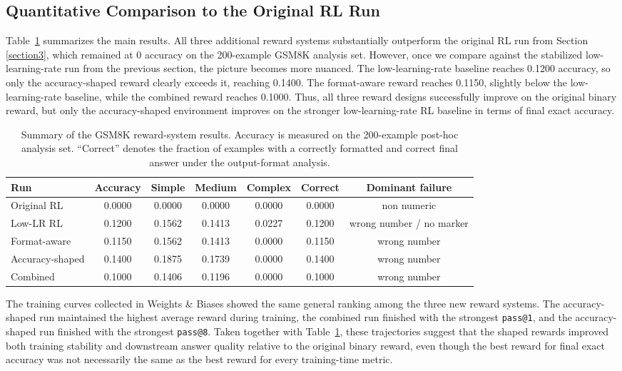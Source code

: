 \documentclass[a4paper,12pt]{article}
\begin{document}
\subsection{Quantitative Comparison to the Original RL Run}

Table~\ref{tab:reward-results-summary} summarizes the main results. All three additional reward systems substantially outperform the original RL run from Section \ref{section3}, which remained at 0 accuracy on the 200-example GSM8K analysis set. However, once we compare against the stabilized low-learning-rate run from the previous section, the picture becomes more nuanced. The low-learning-rate baseline reaches 0.1200 accuracy, so only the accuracy-shaped reward clearly exceeds it, reaching 0.1400. The format-aware reward reaches 0.1150, slightly below the low-learning-rate baseline, while the combined reward reaches 0.1000. Thus, all three reward designs successfully improve on the original binary reward, but only the accuracy-shaped environment improves on the stronger low-learning-rate RL baseline in terms of final exact accuracy.

\begin{table}[ht]
\centering
\footnotesize
\setlength{\tabcolsep}{3.5pt}
\begin{tabular}{lcccccc}
\hline
\textbf{Run} & \textbf{Accuracy} & \textbf{Simple} & \textbf{Medium} & \textbf{Complex} & \textbf{Correct} & \textbf{Dominant failure} \\
\hline
Original RL & 0.0000 & 0.0000 & 0.0000 & 0.0000 & 0.0000 & non numeric \\
Low-LR RL & 0.1200 & 0.1562 & 0.1413 & 0.0227 & 0.1200 & wrong number / no marker \\
Format-aware & 0.1150 & 0.1562 & 0.1413 & 0.0000 & 0.1150 & wrong number \\
Accuracy-shaped & 0.1400 & 0.1875 & 0.1739 & 0.0000 & 0.1400 & wrong number \\
Combined & 0.1000 & 0.1406 & 0.1196 & 0.0000 & 0.1000 & wrong number \\
\hline
\end{tabular}
\caption{Summary of the GSM8K reward-system results. Accuracy is measured on the 200-example post-hoc analysis set. ``Correct'' denotes the fraction of examples with a correctly formatted and correct final answer under the output-format analysis.}
\label{tab:reward-results-summary}
\end{table}

The training curves collected in Weights \& Biases showed the same general ranking among the three new reward systems. The accuracy-shaped run maintained the highest average reward during training, the combined run finished with the strongest \texttt{pass@1}, and the accuracy-shaped run finished with the strongest \texttt{pass@8}. Taken together with Table~\ref{tab:reward-results-summary}, these trajectories suggest that the shaped rewards improved both training stability and downstream answer quality relative to the original binary reward, even though the best reward for final exact accuracy was not necessarily the same as the best reward for every training-time metric.
\end{document}
